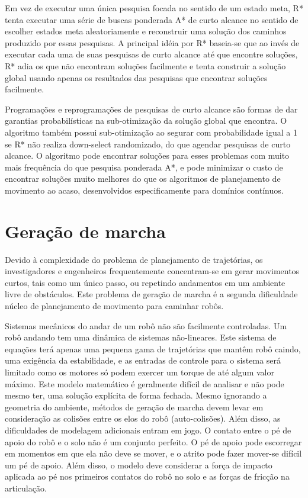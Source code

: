 Em vez de executar uma única pesquisa focada no sentido de um estado meta, R* tenta executar uma série de buscas ponderada A* de curto alcance no sentido 
de escolher estados meta aleatoriamente e reconstruir uma solução dos caminhos produzido por essas pesquisas. A principal idéia por R* baseia-se que ao 
invés de executar cada uma de suas pesquisas de curto alcance até que encontre soluções, R* adia os que não encontram soluções facilmente e tenta construir
a solução global usando apenas os resultados das pesquisas que encontrar soluções facilmente. 

Programações e reprogramações de pesquisas de curto alcance são formas de dar garantias probabilísticas na sub-otimização da solução global que encontra. 
O algoritmo também possui sub-otimização ao segurar com probabilidade igual a 1 se R* não realiza down-select randomizado, do que agendar pesquisas de curto 
alcance. O algoritmo pode encontrar soluções para esses problemas com muito mais frequência do que pesquisa ponderada A*, e pode minimizar o custo de
encontrar soluções muito melhores do que os algoritmos de planejamento de movimento ao acaso, desenvolvidos especificamente para domínios contínuos.

\section{Geração de marcha}
Devido à complexidade do problema de planejamento de trajetórias, os investigadores e engenheiros frequentemente concentram-se 
em gerar movimentos curtos, tais como um único passo, ou repetindo andamentos em um ambiente livre de obstáculos. Este problema 
de geração de marcha é a segunda dificuldade núcleo de planejamento de movimento para caminhar robôs.

Sistemas mecânicos do andar de um robô não são facilmente controladas. Um robô andando tem uma dinâmica de sistemas não-lineares. 
Este sistema de equações terá apenas uma pequena gama de trajetórias que mantêm robô caindo, uma exigência da estabilidade, e as 
entradas de controle para o sistema será limitado como os motores só podem exercer um torque de até algum valor máximo. Este modelo 
matemático é geralmente difícil de analisar e não pode mesmo ter, uma solução explícita de forma fechada. Mesmo ignorando a geometria 
do ambiente, métodos de geração de marcha devem levar em consideração as colisões entre os elos do robô (auto-colisões). Além disso, 
as dificuldades de modelagem adicionais entram em jogo. O contato entre o pé de apoio do robô  e o solo não é um conjunto perfeito. O 
pé de apoio pode escorregar em momentos em que ela não deve se mover, e o atrito pode fazer mover-se difícil um pé de apoio. Além 
disso, o modelo deve considerar a força de impacto aplicada ao pé nos primeiros contatos do robô no solo e as forças de fricção na articulação.

